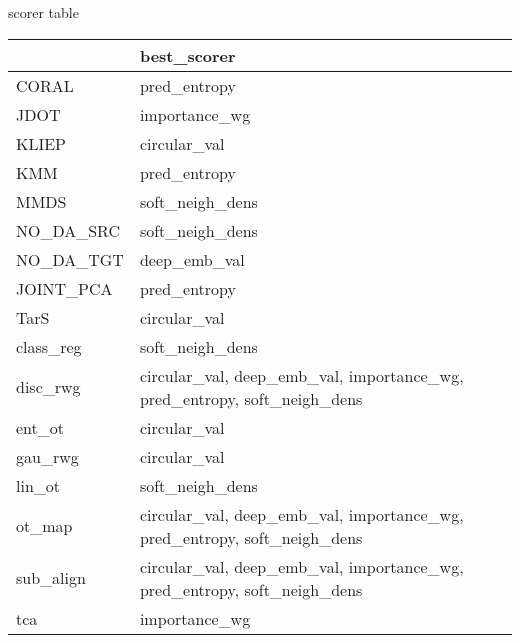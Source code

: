 \subsectionBest scorer table\begin{tabular}{ll}
\hline
           & best\_scorer                                                              \\
\hline
 CORAL     & pred\_entropy                                                             \\
 JDOT      & importance\_wg                                                            \\
 KLIEP     & circular\_val                                                             \\
 KMM       & pred\_entropy                                                             \\
 MMDS      & soft\_neigh\_dens                                                          \\
 NO\_DA\_SRC & soft\_neigh\_dens                                                          \\
 NO\_DA\_TGT & deep\_emb\_val                                                             \\
 JOINT\_PCA & pred\_entropy                                                             \\
 TarS      & circular\_val                                                             \\
 class\_reg & soft\_neigh\_dens                                                          \\
 disc\_rwg  & circular\_val, deep\_emb\_val, importance\_wg, pred\_entropy, soft\_neigh\_dens \\
 ent\_ot    & circular\_val                                                             \\
 gau\_rwg   & circular\_val                                                             \\
 lin\_ot    & soft\_neigh\_dens                                                          \\
 ot\_map    & circular\_val, deep\_emb\_val, importance\_wg, pred\_entropy, soft\_neigh\_dens \\
 sub\_align & circular\_val, deep\_emb\_val, importance\_wg, pred\_entropy, soft\_neigh\_dens \\
 tca       & importance\_wg                                                            \\
\hline
\end{tabular}


